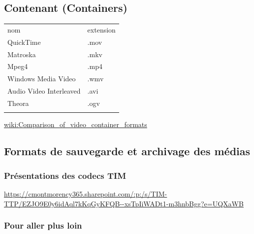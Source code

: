 \documentclass[
  french,
]{book}
\begin{document}
\hypertarget{contenant-containers}{%
\subsection{Contenant (Containers)}\label{contenant-containers}}

\begin{longtable}[]{@{}ll@{}}
\toprule
nom & extension \\ \addlinespace
\midrule
\endhead
QuickTime & .mov \\ \addlinespace
Matroska & .mkv \\ \addlinespace
Mpeg4 & .mp4 \\ \addlinespace
Windows Media Video & .wmv \\ \addlinespace
Audio Video Interleaved & .avi \\ \addlinespace
Theora & .ogv \\ \addlinespace
\bottomrule
\end{longtable}

\href{https://en.wikipedia.org/wiki/Comparison_of_video_container_formats}{wiki:Comparison\_of\_video\_container\_formats}

\hypertarget{formats-de-sauvegarde-et-archivage-des-muxe9dias}{%
\subsection{Formats de sauvegarde et archivage des médias}\label{formats-de-sauvegarde-et-archivage-des-muxe9dias}}

\hypertarget{pruxe9sentations-des-codecs-tim}{%
\subsubsection{Présentations des codecs TIM}\label{pruxe9sentations-des-codecs-tim}}

\url{https://cmontmorency365.sharepoint.com/:p:/s/TIM-TTP/EZJO9E0y6idAql7kKqGyKFQB--xsTpIiWADt1-m3hnbBgg?e=UQXaWB}

\hypertarget{pour-aller-plus-loin}{%
\subsubsection{Pour aller plus loin}\label{pour-aller-plus-loin}}
\end{document}
